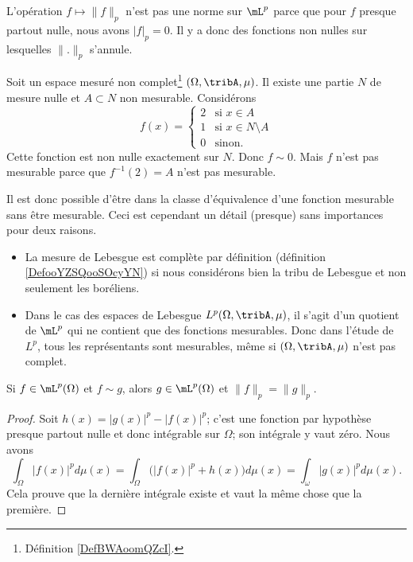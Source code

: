 \begin{normaltext}
    L'opération \( f\mapsto \| f \|_p\) n'est pas une norme sur \( \mL^p\) parce que pour \( f\) presque partout nulle, nous avons \( | f |_p=0\). Il y a donc des fonctions non nulles sur lesquelles \( \| . \|_p\) s'annule.
\end{normaltext}

\begin{normaltext}
    Soit un espace mesuré non complet\footnote{Définition \ref{DefBWAoomQZcI}.} \( (\Omega,\tribA,\mu)\). Il existe une partie \( N\) de mesure nulle et \( A\subset N\) non mesurable. Considérons
    \begin{equation}
        f(x)=\begin{cases}
            2    &   \text{si } x\in A\\
            1    &   \text{si } x\in N\setminus A\\
            0    &    \text{sinon. }
        \end{cases}
    \end{equation}
    Cette fonction est non nulle exactement sur \( N\). Donc \( f\sim 0\). Mais \( f\) n'est pas mesurable parce que \( f^{-1}(2)=A\) n'est pas mesurable.

    Il est donc possible d'être dans la classe d'équivalence d'une fonction mesurable sans être mesurable. Ceci est cependant un détail (presque) sans importances pour deux raisons.
    \begin{itemize}
        \item La mesure de Lebesgue est complète par définition (définition \ref{DefooYZSQooSOcyYN}) si nous considérons bien la tribu de Lebesgue et non seulement les boréliens. 
        \item Dans le cas des espaces de Lebesgue \( L^p(\Omega,\tribA,\mu)\), il s'agit d'un quotient de \( \mL^p\) qui ne contient que des fonctions mesurables. Donc dans l'étude de \( L^p\), tous les représentants sont mesurables, même si \( (\Omega,\tribA,\mu)\) n'est pas complet.
    \end{itemize}
\end{normaltext}

\begin{lemma}       \label{LemKZVHVAR}
    Si \( f\in \mL^p(\Omega)\) et \( f\sim g\), alors \( g\in \mL^p(\Omega)\) et \( \| f \|_p=\| g \|_p\).
\end{lemma}

\begin{proof}
    Soit \( h(x)=| g(x) |^p-| f(x) |^p\); c'est une fonction par hypothèse presque partout nulle et donc intégrable sur \( \Omega\); son intégrale y vaut zéro. Nous avons
    \begin{equation}
        \int_{\Omega}| f(x) |^pd\mu(x)=\int_{\Omega}\Big( | f(x) |^p+h(x)\big)d\mu(x)=\int_{\omega}| g(x) |^pd\mu(x).
    \end{equation}
    Cela prouve que la dernière intégrale existe et vaut la même chose que la première.
\end{proof}

